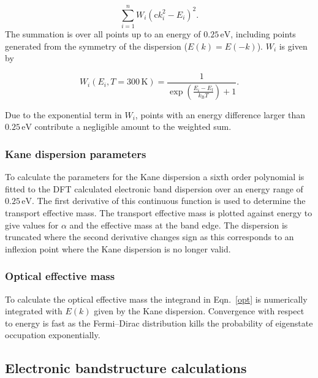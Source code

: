 \begin{equation}
\sum^n_{i=1}W_i(\mathrm{c}k_i^2 - E_i)^2.
\end{equation}
The summation is over all points up to an energy of $0.25\,\mathrm{eV}$, including points generated from the symmetry of the dispersion ($E(k)=E(-k)$). 
$W_i$ is given by

\begin{equation}
W_{i}(E_i,T=300\,\mathrm{K}) = \frac{1}{\exp\left(\frac{E_i-E_{\text{f}}}{k_{\text{B}}T}\right)+1}.
\end{equation}

Due to the exponential term in $W_i$, points with an energy difference larger than $0.25\,\mathrm{eV}$ contribute a negligible amount to the weighted sum. 

\subsubsection{Kane dispersion parameters}

To calculate the parameters for the Kane dispersion a sixth order polynomial is fitted to the DFT calculated electronic band dispersion over an energy range of $0.25\,\mathrm{eV}$. The first derivative of this continuous function is used to determine the transport effective mass. The transport effective mass is plotted against energy to give values for $\alpha$ and the effective mass at the band edge. The dispersion is truncated where the second derivative changes sign as this corresponds to an inflexion point where the Kane dispersion is no longer valid. 

\subsubsection{Optical effective mass}

To calculate the optical effective mass the integrand in Eqn.\ \ref{opt} is numerically integrated with $E(k)$ given by the Kane dispersion. Convergence with respect to energy is fast as the Fermi--Dirac distribution kills the probability of eigenstate occupation exponentially. 

\subsection{Electronic bandstructure calculations}

